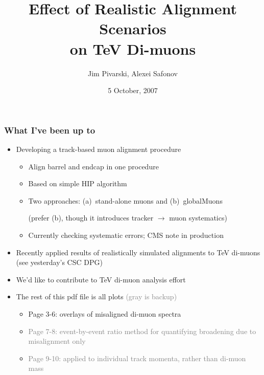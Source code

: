 \documentclass[compress]{beamer}
\title{Effect of Realistic Alignment Scenarios \\ on TeV Di-muons}
\author{Jim Pivarski, Alexei Safonov}
\institute{Texas A\&M University}
\date{ 5 October, 2007}
\begin{document}
\frame{\titlepage}

\begin{frame}
\frametitle{What I've been up to}
\begin{itemize}
\item Developing a track-based muon alignment procedure
\begin{itemize}\setlength{\itemsep}{0.1 cm}
\item Align barrel and endcap in one procedure
\item Based on simple HIP algorithm
\item Two approaches: (a)~stand-alone muons and (b)~globalMuons

(prefer (b), though it introduces tracker $\to$ muon systematics)

\item Currently checking systematic errors; CMS note in production
\end{itemize}

\item Recently applied results of realistically simulated alignments
to TeV di-muons (see yesterday's CSC DPG)

\item We'd like to contribute to TeV di-muon analysis effort

\item The rest of this pdf file is all plots \hfill\textcolor{gray}{(gray is backup)}
\begin{itemize}\setlength{\itemsep}{0.1 cm}
\item Page 3-6: overlays of misaligned di-muon spectra
\item \textcolor{gray}{Page 7-8: event-by-event ratio method for quantifying broadening due to misalignment only}
\item \textcolor{gray}{Page 9-10: applied to individual track momenta, rather than di-muon mass}
\end{itemize}
\end{itemize}
\end{frame}
\end{document}
